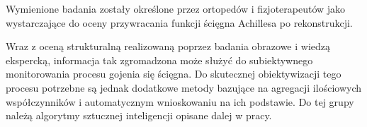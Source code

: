 Wymienione badania zostały określone przez ortopedów i fizjoterapeutów jako wystarczające do oceny przywracania funkcji ścięgna Achillesa po rekonstrukcji. 

Wraz z oceną strukturalną realizowaną poprzez badania obrazowe i wiedzą ekspercką, informacja tak zgromadzona może służyć do subiektywnego monitorowania procesu gojenia się ścięgna. Do skutecznej obiektywizacji tego procesu potrzebne są jednak dodatkowe metody bazujące na agregacji ilościowych współczynników \linebreak i automatycznym wnioskowaniu na ich podstawie. Do tej grupy należą algorytmy sztucznej inteligencji opisane dalej w pracy. 